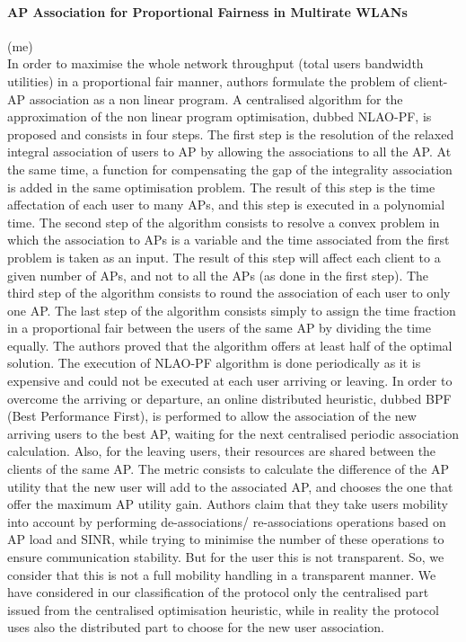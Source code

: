 \documentclass[journal,transmag]{IEEEtran}
\begin{document}
\paragraph{AP Association for Proportional Fairness in Multirate WLANs} (me)
\cite{10approximate_optimisation_proportional,14AP_association_multirate_WLAN}\\
In order to maximise the whole network throughput (total users bandwidth utilities) in a proportional fair manner, authors formulate the problem of client-AP association as a non linear program. A centralised algorithm for the approximation of the non linear program optimisation, dubbed NLAO-PF, is proposed and consists in four steps. The first step is the resolution of the relaxed integral association of users to AP by allowing the associations to all the AP. At the same time, a function for compensating the gap of the integrality association is added in the same optimisation problem. The result of this step is the time affectation of each user to many APs, and this step is executed in a polynomial time. The second step of the algorithm consists to resolve a convex problem in which the association to APs is a variable and the time associated from the first problem is taken as an input. The result of this step will affect each client to a given number of APs, and not to all the APs (as done in the first step). The third step of the algorithm consists to round the association of each user to only one AP. The last step of the algorithm consists simply to assign the time fraction in a proportional fair between the users of the same AP by dividing the time equally. The authors proved that the algorithm offers at least half of the optimal solution. The execution of NLAO-PF algorithm is done periodically as it is expensive and could not be executed at each user arriving or leaving. In order to overcome the arriving or departure, an online distributed heuristic, dubbed BPF (Best Performance First), is performed to allow the association of the new arriving users to the best AP, waiting for the next centralised periodic association calculation. Also, for the leaving users, their resources are shared between the clients of the same AP. The metric consists to calculate the difference of the AP utility that the new user will add to the associated AP, and chooses the one that offer the maximum AP utility gain. Authors claim that they take users mobility into account by performing de-associations/ re-associations operations based on AP load and SINR, while trying to minimise the number of these operations to ensure communication stability. But for the user this is not transparent. So, we consider that this is not a full mobility handling in a transparent manner. We have considered in our classification of the protocol only the centralised part issued from the centralised optimisation heuristic, while in reality the protocol uses also the distributed part to choose for the new user association. \\
\end{document}
